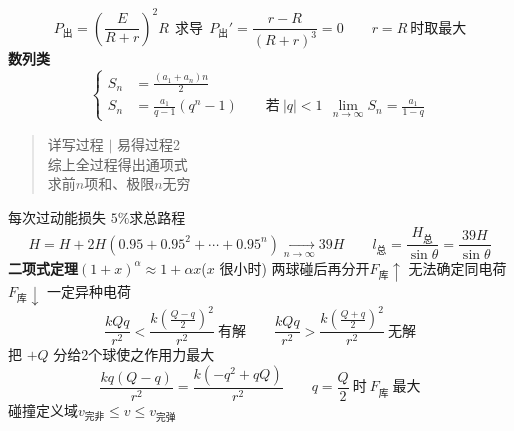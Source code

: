 \[
P_{\text{出}}=\left(\frac{E}{R+r}\right)^{2}R\ \ \text{求导}\ \ P_{\text{出}}'=\frac{r-R}{(R+r)^{3}}=0\qquad r=R\ \text{时取最大}
\]
\textbf{数列类}
\[
\left\{\begin{aligned}
S_n&=\frac{(a_1+a_n)n}{2}\\
S_n&=\frac{a_1}{q-1}(q^{n}-1)\qquad \text{若}\ |q|<1\ \ \lim_{n\to\infty}S_n=\frac{a_1}{1-q}
\end{aligned}\right.
\]
\begin{quote}
详写过程 $|$ 易得过程2\\
综上全过程得出通项式\\
求前$n$项和、极限$n$无穷
\end{quote}

每次过动能损失 $5\%$\quad 求总路程
\[
H=H+2H(0.95+0.95^{2}+\cdots+0.95^{n})\xrightarrow[n\to\infty]{}39H
\qquad l_{\text{总}}=\frac{H_{\text{总}}}{\sin\theta}=\frac{39H}{\sin\theta}
\]
\textbf{二项式定理}\quad $(1+x)^{\alpha}\approx 1+\alpha x$\quad ($x$ 很小时)
两球碰后再分开\quad $F_{\text{库}}\uparrow$ 无法确定同电荷\quad $F_{\text{库}}\downarrow$ 一定异种电荷
\[
\frac{kQq}{r^{2}}<\frac{k\left(\frac{Q-q}{2}\right)^{2}}{r^{2}}\ \text{有解}\qquad
\frac{kQq}{r^{2}}>\frac{k\left(\frac{Q+q}{2}\right)^{2}}{r^{2}}\ \text{无解}
\]
把 $+Q$ 分给2个球使之作用力最大
\[
\frac{kq(Q-q)}{r^{2}}=\frac{k(-q^{2}+qQ)}{r^{2}}\qquad q=\frac{Q}{2}\ \text{时}\ F_{\text{库}}\ \text{最大}
\]
碰撞定义域\quad $v_{\text{完非}}\le v\le v_{\text{完弹}}$

